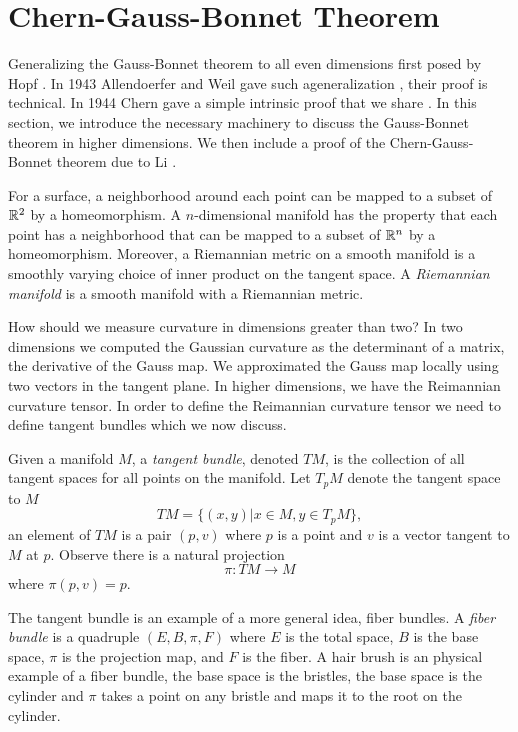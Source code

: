 \section{Chern-Gauss-Bonnet Theorem}
\label{sec:chern-gauss-bonnet}

Generalizing the Gauss-Bonnet theorem to all even dimensions
first posed by Hopf \cite{hopf_uber_1926}.
In 1943 Allendoerfer and Weil gave such ageneralization \cite{allendoerfer_gauss-bonnet_1943},
their proof is technical. In 1944 Chern gave a simple intrinsic proof
that we share \cite{chern_simple_1944}. In this section, we introduce
the necessary machinery to discuss the Gauss-Bonnet theorem in higher
dimensions. We then include a proof of the Chern-Gauss-Bonnet theorem
due to Li \cite{li_gauss-bonnet-chern_2011}. 

For a surface, a neighborhood around each point can be mapped 
 to a subset of $\mathbb{R}^2$ by a  homeomorphism. A $n$-dimensional manifold has
the property that each point has a neighborhood that can be mapped
to a subset of $\mathbb{R}^n$ by a homeomorphism. Moreover,
a Riemannian metric on a smooth manifold is a smoothly varying
choice of inner product on the tangent space. A \emph{Riemannian manifold}
is a smooth manifold with a Riemannian metric. 


How should we measure curvature in dimensions greater than two?
In two dimensions we computed the Gaussian curvature as the determinant of
a matrix, the derivative of the Gauss map. We approximated the Gauss map
locally using two vectors in the tangent plane.
In higher dimensions, we have the Reimannian curvature tensor. 
In order to define the Reimannian curvature tensor we need to define
tangent bundles which we now discuss.

Given a manifold $M$, 
a \emph{tangent bundle}, denoted $TM$, is the collection of all tangent spaces for all points on
the manifold. Let $T_pM$ denote the tangent space to $M$
$$TM=\{(x,y)| x\in M, y\in T_pM\},$$
an element of $TM$ is a pair $(p,v)$ where $p$ is a point and $v$ 
is a vector tangent to $M$ at $p.$ Observe there is a natural projection
$$\pi:TM\rightarrow M$$
where $\pi(p,v)=p.$

The tangent bundle is an example of a more general idea, fiber bundles.
A \emph{fiber bundle} is a quadruple $(E,B,\pi, F)$ where $E$ is the total space, 
$B$ is the base space, $\pi$ is the projection map, and $F$ is the fiber.
A hair brush is an physical example of a fiber bundle, the base space is the bristles,
the base space is the cylinder and $\pi$ takes a point on any bristle and maps it to
the root on the cylinder.


